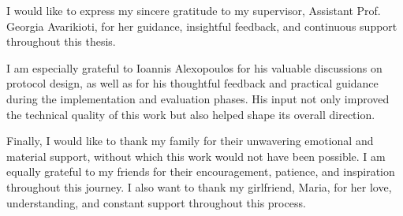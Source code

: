\documentclass[final,twoside]{vutinfth}
\begin{document}
\frontmatter


\begin{acknowledgements*}
I would like to express my sincere gratitude to my supervisor, Assistant Prof.
Georgia Avarikioti, for her guidance, insightful feedback, and continuous
support throughout this thesis.

I am especially grateful to Ioannis Alexopoulos for his valuable discussions on
protocol design, as well as for his thoughtful feedback and practical guidance
during the implementation and evaluation phases. His input not only improved
the technical quality of this work but also helped shape its overall direction.

Finally, I would like to thank my family for their unwavering emotional and
material support, without which this work would not have been possible. I am
equally grateful to my friends for their encouragement, patience, and
inspiration throughout this journey. I also want to thank my girlfriend, Maria,
for her love, understanding, and constant support throughout this process.
\end{acknowledgements*}
\end{document}
